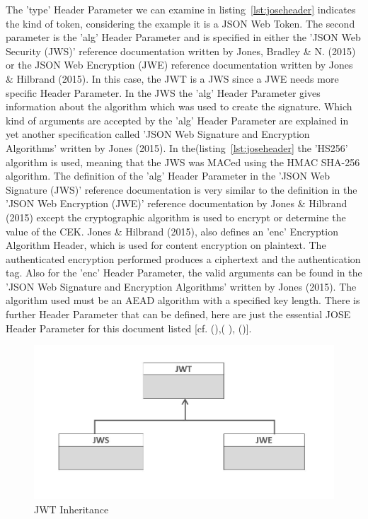 The 'type' Header Parameter we can examine in listing~\ref{lst:joseheader} indicates the kind of token, considering the example it is a JSON Web Token. The second parameter is the 'alg' Header Parameter and is specified in either the 'JSON Web Security (JWS)' reference documentation written by Jones, Bradley \& N. (2015) or the JSON Web Encryption (JWE) reference documentation written by Jones \& Hilbrand (2015). In this case, the JWT is a JWS since a JWE needs more specific Header Parameter. In the JWS the 'alg' Header Parameter gives information about the algorithm which was used to create the signature. Which kind of arguments are accepted by the 'alg' Header Parameter are explained in yet another specification called 'JSON Web Signature and Encryption Algorithms' written by Jones (2015). In the(listing~\ref{lst:joseheader} the 'HS256' algorithm is used, meaning that the JWS was MACed using the HMAC SHA-256 algorithm. The definition of the 'alg' Header Parameter in the 'JSON Web Signature (JWS)' reference documentation is very similar to the definition in the 'JSON Web Encryption (JWE)' reference documentation by Jones \& Hilbrand (2015) except the cryptographic algorithm is used to encrypt or determine the value of the CEK. Jones \& Hilbrand (2015), also defines an 'enc' Encryption Algorithm Header, which is used for content encryption on plaintext. The authenticated encryption performed produces a ciphertext and the authentication tag. Also for the 'enc' Header Parameter, the valid arguments can be found in the 'JSON Web Signature and Encryption Algorithms' written by Jones (2015). The algorithm used must be an AEAD algorithm with a specified key length. There is further Header Parameter that can be defined, here are just the essential JOSE Header Parameter for this document listed [cf. (\cite{JWE:IETF:Jones:2015}),( \cite{JWA:Jones:2015}), (\cite{JWS:IETF:Jones:2015})]. 

\begin{figure}[h]
	\centering
	\includegraphics[width=0.8\linewidth]{images/jwtjwsjwe2}
	\caption{JWT Inheritance}
	\label{fig:jwtjwsjwe2}
\end{figure}

